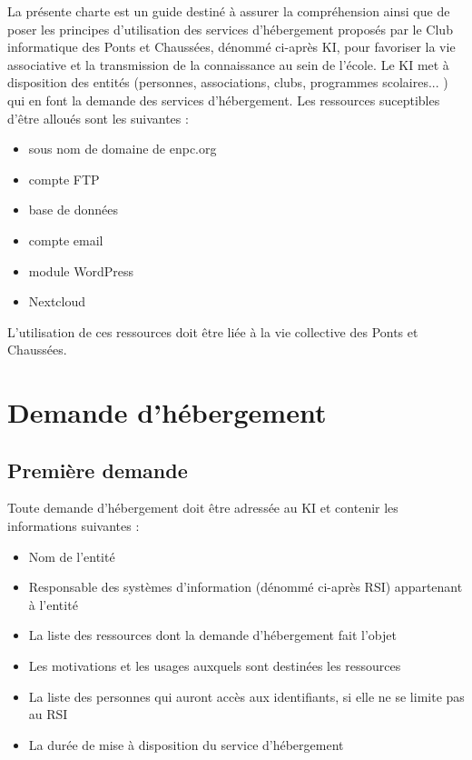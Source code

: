 \documentclass{charteki019}
\begin{document}


La présente charte est un guide destiné à assurer la compréhension ainsi que de poser les principes d'utilisation des services d'hébergement proposés par le Club informatique des Ponts et Chaussées, dénommé ci-après KI, pour favoriser la vie associative et la transmission de la connaissance au sein de l'école. Le KI met à disposition des entités (personnes, associations, clubs, programmes scolaires... ) qui en font la demande des services d'hébergement. Les ressources suceptibles d'être alloués sont les suivantes :
\begin{itemize}
\item sous nom de domaine de enpc.org
\item compte FTP
\item base de données
\item compte email
\item module WordPress
\item Nextcloud
\end{itemize}

L'utilisation de ces ressources doit être liée à la vie collective des Ponts et Chaussées.

\section{Demande d'hébergement}

\subsection{Première demande}

Toute demande d'hébergement doit être adressée au KI et contenir les informations suivantes :
\begin{itemize}
\item Nom de l'entité
\item Responsable des systèmes d'information (dénommé ci-après RSI) appartenant à l'entité
\item La liste des ressources dont la demande d'hébergement fait l'objet
\item Les motivations et les usages auxquels sont destinées les ressources
\item La liste des personnes qui auront accès aux identifiants, si elle ne se limite pas au RSI
\item La durée de mise à disposition du service d'hébergement
\end{itemize}
\end{document}
